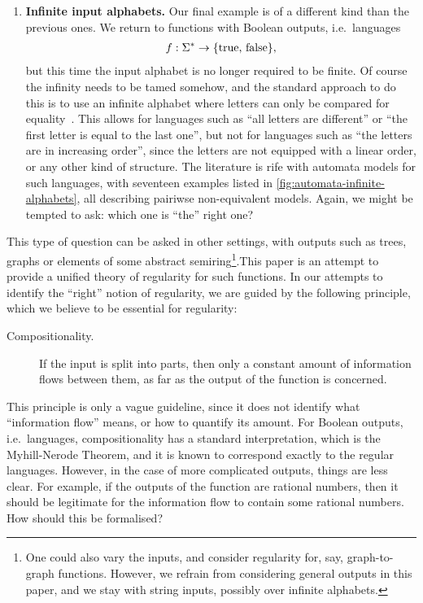 \begin{enumerate}
\item \textbf{Infinite input alphabets.}
Our final example is of a different kind than the previous ones. We return to functions with Boolean outputs, i.e.~languages
\begin{align*}
f : \Sigma^* \to \{\text{true, false}\},
\end{align*}
but this time the input alphabet is no longer required to be finite. Of course the infinity needs to be tamed somehow, and the standard approach to do this is to use an infinite alphabet where letters can only be compared for equality~\cite{kaminskiFiniteMemoryAutomata1994}. This allows for languages such as ``all letters are different'' or ``the first letter is equal to the last one'', but not for languages such as ``the letters are in increasing order'', since the letters are not equipped with a linear order, or any other kind of structure.
The literature is rife with automata models for such languages, with seventeen examples listed in \cref{fig:automata-infinite-alphabets}, all describing pairiwse non-equivalent models. 
 Again, we might be tempted to ask: which one is  ``the'' right one?
\end{enumerate}

This type of question can be asked in other settings, with   outputs such as  trees,  graphs or elements of some abstract semiring\footnote{One could also vary the inputs, and consider regularity for, say, graph-to-graph functions. However,  we refrain from considering general outputs in this paper, and we stay with string inputs, possibly over infinite alphabets.}.This paper is an attempt to provide a unified theory of regularity for such functions.   In our attempts to identify the ``right'' notion of regularity, we are guided by  the following principle, which we believe to be essential for regularity:
\begin{description}
    \item[Compositionality.]  If the input is split into parts, then only a constant amount of information  flows between them, as far as the output of the function is concerned.
\end{description}
This principle is only a vague guideline, since it does not identify what ``information flow'' means, or how to quantify its amount. For Boolean outputs, i.e.~languages, compositionality has a standard interpretation, which is the Myhill-Nerode Theorem, and it is known to correspond exactly to the regular languages. However, in the case of more complicated outputs, things are less clear.  For example, if the outputs of the function are rational numbers, then it should be legitimate for the information flow to contain some rational numbers. How should this be formalised?

